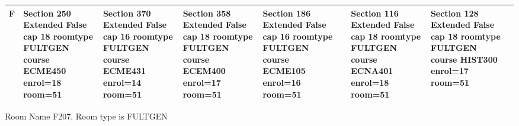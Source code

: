 \documentclass{article} \usepackage[margin=0.5in]{geometry}
\newcommand{\textgr}[1]{\cellcolor{gray!40}\textbf{#1}}
\begin{document}
\begin{tabular}{|c|z|z|z|z|z|z|z|z|}
\hline
\textgr{F} &  Section 250 Extended False cap 18 roomtype FULTGEN course ECME450 enrol=18 room=51 & Section 370 Extended False cap 16 roomtype FULTGEN course ECME431 enrol=14 room=51 & Section 358 Extended False cap 18 roomtype FULTGEN course ECEM400 enrol=17 room=51 & Section 186 Extended False cap 16 roomtype FULTGEN course ECME105 enrol=16 room=51 &  & Section 116 Extended False cap 18 roomtype FULTGEN course ECNA401 enrol=18 room=51 & Section 128 Extended False cap 18 roomtype FULTGEN course HIST300 enrol=17 room=51 &  \\[65pt]
\hline
\end{tabular}

	
Room Name F207, Room type is FULTGEN 
\newpage
	
\end{document}
